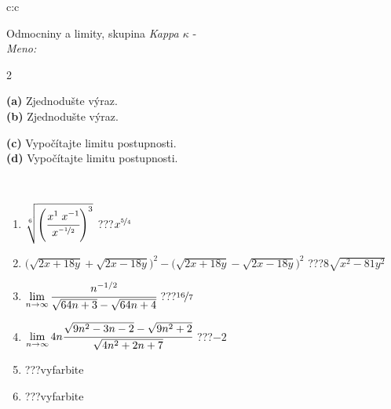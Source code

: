 \documentclass[10pt]{report}
\begin{document}
\begin{tabular}{c:c}
\begin{minipage}[c][104.5mm][t]{0.5\linewidth}
\begin{center}
\vspace{7mm}
{\huge Odmocniny a limity, skupina \textit{Kappa $\kappa$} -}\\[5mm]
\textit{Meno:}\phantom{xxxxxxxxxxxxxxxxxxxxxxxxxxxxxxxxxxxxxxxxxxxxxxxxxxxxxxxxxxxxxxxxx}\\[5mm]
\begin{minipage}{0.95\linewidth}
\begin{center}
{\small \begin{multicols}{2} \raggedright
\textbf{(a)} Zjednodušte výraz. \\[1mm]
\textbf{(b)} Zjednodušte výraz. \par \columnbreak
\textbf{(c)} Vypočítajte limitu postupnosti. \\[1mm]
\textbf{(d)} Vypočítajte limitu postupnosti.
\end{multicols}
}
\end{center}
\end{minipage}
\\[4mm]
\begin{minipage}{0.79\linewidth}
\begin{center}
\begin{varwidth}{\linewidth}
\begin{enumerate}
\small
\item $\sqrt[6]{\left(\cfrac{x^{1}\;x^{-1}}{x^{\nicefrac{-1}{2}}}\right)^{3}}$\quad \dotfill\; ???\;\dotfill \quad $x^{\nicefrac{5}{4}}$
\item {\footnotesize{\scriptsize$\big(\sqrt{2x+18y}+\sqrt{2x-18y}\big)^2-\big(\sqrt{2x+18y}-\sqrt{2x-18y}\big)^2$}\quad \dotfill\; ???\;\dotfill \quad $8\sqrt{x^2-81y^2}$}
\item $\lim\limits_{n\to\infty}\cfrac{n^{-1/2}}{\sqrt{64n+3}-\sqrt{64n+4}}$\quad \dotfill\; ???\;\dotfill \quad $\nicefrac{16}{7}$
\item $\lim\limits_{n\to\infty}4n\cfrac{\sqrt{9n^2-3n-2}-\sqrt{9n^2+2}}{\sqrt{4n^2+2n+7}}$\quad \dotfill\; ???\;\dotfill \quad $-2$
\item \quad \dotfill\; ???\;\dotfill \quad vyfarbite
\item \quad \dotfill\; ???\;\dotfill \quad vyfarbite
\end{enumerate}
\end{varwidth}
\end{center}
\end{minipage}

\end{center}
\end{minipage}
\end{tabular}
\end{document}
